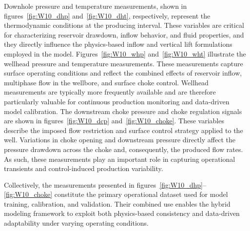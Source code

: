 \documentclass[12pt,APA]{uomthesis}
\begin{document}
\begin{table}[h!]
\end{table}

Downhole pressure and temperature measurements, shown in figures~\ref{fig:W10_dhp} and~\ref{fig:W10_dht}, respectively, represent the thermodynamic conditions at the producing interval. These variables are critical for characterizing reservoir drawdown, inflow behavior, and fluid properties, and they directly influence the physics-based inflow and vertical lift formulations employed in the model.
Figures~\ref{fig:W10_whp} and~\ref{fig:W10_wht} illustrate the wellhead pressure and temperature measurements. These measurements capture surface operating conditions and reflect the combined effects of reservoir inflow, multiphase flow in the wellbore, and surface choke control. Wellhead measurements are typically more frequently available and are therefore particularly valuable for continuous production monitoring and data-driven model calibration.
The downstream choke pressure and choke regulation signals are shown in figures~\ref{fig:W10_dcp} and~\ref{fig:W10_choke}. These variables describe the imposed flow restriction and surface control strategy applied to the well. Variations in choke opening and downstream pressure directly affect the pressure drawdown across the choke and, consequently, the produced flow rates. As such, these measurements play an important role in capturing operational transients and control-induced production variability.

Collectively, the measurements presented in figures~\ref{fig:W10_dhp}--\ref{fig:W10_choke} constitute the primary operational dataset used for model training, calibration, and validation. Their combined use enables the hybrid modeling framework to exploit both physics-based consistency and data-driven adaptability under varying operating conditions.
\end{document}

